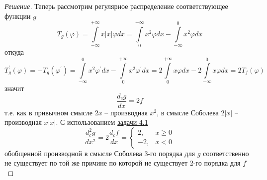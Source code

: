 \documentclass[12pt,a4paper]{article}
\theoremstyle{definition}
\newenvironment{solution}
{\renewcommand\qedsymbol{$\blacksquare$}\begin{proof}[Решение]}
{\end{proof}}
\begin{document}
\begin{solution}
	Теперь рассмотрим регулярное распределение соответствующее функции $g$
	\begin{equation*}
		T_g (\varphi) = \int\limits_{-\infty}^{+\infty} {x |x| \varphi dx} = \int\limits_{0}^{+\infty}{x^2 \varphi dx} - \int\limits_{-\infty}^{0}{x^2 \varphi dx}
	\end{equation*}
	откуда
	\begin{equation*}
		T^\prime_g (\varphi) = -T_g (\varphi^\prime) = \int\limits_{-\infty}^{0}{x^2 \varphi^\prime dx} - \int\limits_{0}^{+\infty}{x^2 \varphi^\prime dx} = 2 \int\limits_{0}^{+\infty}{x \varphi dx} - 2 \int\limits_{-\infty}^{0}{x\varphi dx} = 2 T_f (\varphi) 
	\end{equation*}
	значит 
	\begin{equation*}
		\frac{d_c g}{dx} = 2f
	\end{equation*}
	т.е. как в привычном смысле $2x$ -- производная $x^2$, в смысле Соболева $2|x|$ -- производная $x|x|$. 
	С использованием \hyperref[ex:1]{задачи 4.1}
	\begin{equation*}
		\frac{d_c^2 g}{dx^2} = 2 \frac{d_c f}{dx} = 
		\begin{cases}
			2, &x \geq 0 \\
			-2, &x < 0
		\end{cases}
	\end{equation*}
	обобщенной производной в смысле Соболева 3-го порядка для $g$ соответственно не существует по той же причине по которой не существует 2-го порядка для $f$
\end{solution}

\newpage
	
\end{document}
